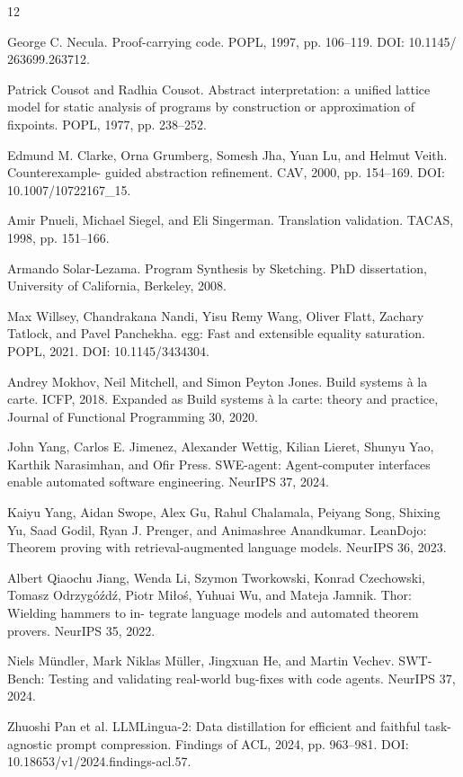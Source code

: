 \documentclass{article}
\begin{document}
\clearpage\begin{thebibliography}{12}

 George C. Necula. Proof-carrying code. POPL, 1997, pp. 106–119. DOI: 10.1145/ 263699.263712.

 Patrick Cousot and Radhia Cousot. Abstract interpretation: a unified lattice model for static analysis of programs by construction or approximation of fixpoints. POPL, 1977, pp. 238–252.

 Edmund M. Clarke, Orna Grumberg, Somesh Jha, Yuan Lu, and Helmut Veith. Counterexample- guided abstraction refinement. CAV, 2000, pp. 154–169. DOI: 10.1007/10722167\_15.

 Amir Pnueli, Michael Siegel, and Eli Singerman. Translation validation. TACAS, 1998, pp. 151–166.

 Armando Solar-Lezama. Program Synthesis by Sketching. PhD dissertation, University of California, Berkeley, 2008.

 Max Willsey, Chandrakana Nandi, Yisu Remy Wang, Oliver Flatt, Zachary Tatlock, and Pavel Panchekha. egg: Fast and extensible equality saturation. POPL, 2021. DOI: 10.1145/3434304.

 Andrey Mokhov, Neil Mitchell, and Simon Peyton Jones. Build systems à la carte. ICFP, 2018. Expanded as Build systems à la carte: theory and practice, Journal of Functional Programming 30, 2020.

 John Yang, Carlos E. Jimenez, Alexander Wettig, Kilian Lieret, Shunyu Yao, Karthik Narasimhan, and Ofir Press. SWE-agent: Agent-computer interfaces enable automated software engineering. NeurIPS 37, 2024.

 Kaiyu Yang, Aidan Swope, Alex Gu, Rahul Chalamala, Peiyang Song, Shixing Yu, Saad Godil, Ryan J. Prenger, and Animashree Anandkumar. LeanDojo: Theorem proving with retrieval-augmented language models. NeurIPS 36, 2023.

 Albert Qiaochu Jiang, Wenda Li, Szymon Tworkowski, Konrad Czechowski, Tomasz Odrzygóźdź, Piotr Miłoś, Yuhuai Wu, and Mateja Jamnik. Thor: Wielding hammers to in- tegrate language models and automated theorem provers. NeurIPS 35, 2022.

 Niels Mündler, Mark Niklas Müller, Jingxuan He, and Martin Vechev. SWT-Bench: Testing and validating real-world bug-fixes with code agents. NeurIPS 37, 2024.

 Zhuoshi Pan et al. LLMLingua-2: Data distillation for efficient and faithful task-agnostic prompt compression. Findings of ACL, 2024, pp. 963–981. DOI: 10.18653/v1/2024.findings-acl.57.

\end{thebibliography}
\end{document}

